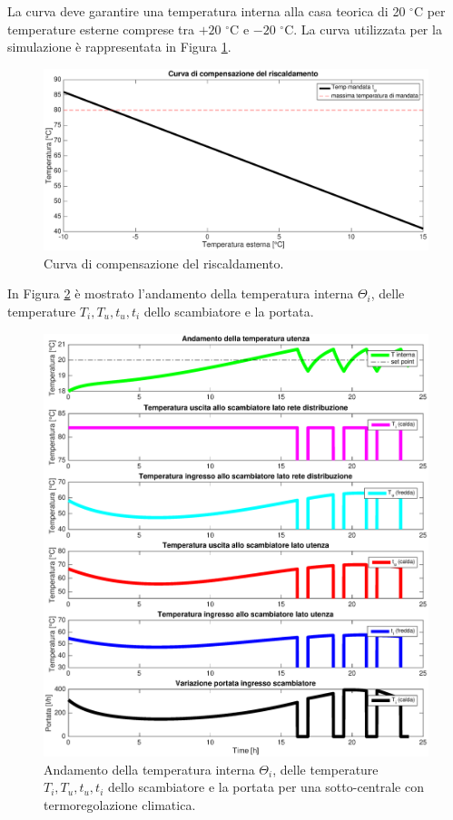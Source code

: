 \documentclass[laurea,oneside,11pt]{USiena_tesiLM3}
\begin{document}
La curva deve garantire una temperatura interna alla casa teorica di 20 $^{\circ}$C  per temperature esterne comprese tra $+20$ $^{\circ}$C e $-20$ $^{\circ}$C. La curva  utilizzata per la simulazione è rappresentata in Figura \ref{fig:curva_comp}.
 
 \begin{figure}[!ht]
\centering
\includegraphics[width=\textwidth]{figure/curva_comp} 
\caption{Curva di compensazione del riscaldamento.}
\label{fig:curva_comp}
\end{figure}


In Figura \ref{fig:reg_climatica} è mostrato l'andamento della temperatura interna $\Theta_i$, delle temperature $T_i, T_u, t_u, t_i$ dello scambiatore e la portata.

\begin{figure}[!ht]
\centering
\includegraphics[width=\textwidth]{figure/reg_climatica} 
\caption{Andamento della temperatura interna $\Theta_i$, delle temperature $T_i, T_u, t_u, t_i$ dello scambiatore e la portata per una sotto-centrale con termoregolazione climatica.}
\label{fig:reg_climatica}
\end{figure}
\end{document}

